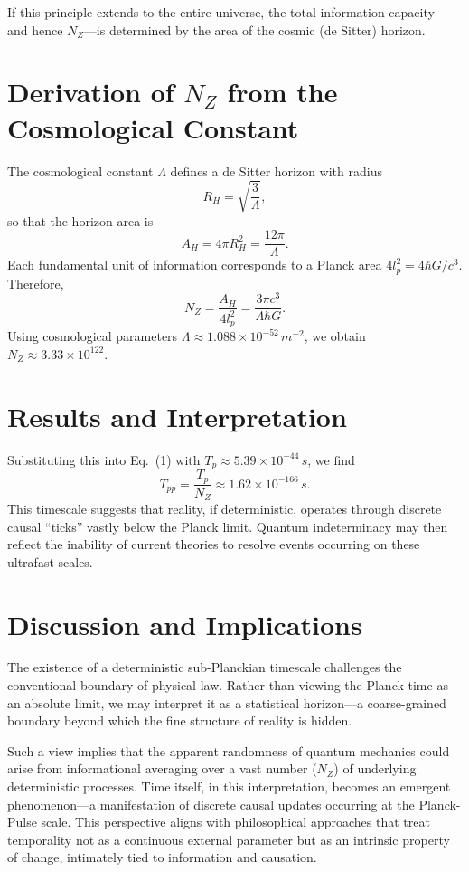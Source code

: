 \documentclass[12pt]{article}
\begin{document}
If this principle extends to the entire universe, the total information capacity---and hence $N_Z$---is determined by the area of the cosmic (de Sitter) horizon.

\section{Derivation of $N_Z$ from the Cosmological Constant}
The cosmological constant $\Lambda$ defines a de Sitter horizon with radius
\begin{equation}
R_H = \sqrt{\frac{3}{\Lambda}},
\end{equation}
so that the horizon area is
\begin{equation}
A_H = 4\pi R_H^2 = \frac{12\pi}{\Lambda}.
\end{equation}
Each fundamental unit of information corresponds to a Planck area $4l_p^2 = 4\hbar G / c^3$. Therefore,
\begin{equation}
N_Z = \frac{A_H}{4l_p^2} = \frac{3\pi c^3}{\Lambda \hbar G}.
\end{equation}
Using cosmological parameters $\Lambda \approx 1.088 \times 10^{-52}\, m^{-2}$, we obtain $N_Z \approx 3.33 \times 10^{122}$.

\section{Results and Interpretation}
Substituting this into Eq.~(1) with $T_p \approx 5.39 \times 10^{-44}\,s$, we find
\begin{equation}
T_{pp} = \frac{T_p}{N_Z} \approx 1.62 \times 10^{-166}\,s.
\end{equation}
This timescale suggests that reality, if deterministic, operates through discrete causal ``ticks'' vastly below the Planck limit. Quantum indeterminacy may then reflect the inability of current theories to resolve events occurring on these ultrafast scales.

\section{Discussion and Implications}
The existence of a deterministic sub-Planckian timescale challenges the conventional boundary of physical law. Rather than viewing the Planck time as an absolute limit, we may interpret it as a statistical horizon---a coarse-grained boundary beyond which the fine structure of reality is hidden.

Such a view implies that the apparent randomness of quantum mechanics could arise from informational averaging over a vast number ($N_Z$) of underlying deterministic processes. Time itself, in this interpretation, becomes an emergent phenomenon---a manifestation of discrete causal updates occurring at the Planck-Pulse scale. This perspective aligns with philosophical approaches that treat temporality not as a continuous external parameter but as an intrinsic property of change, intimately tied to information and causation.
\end{document}
